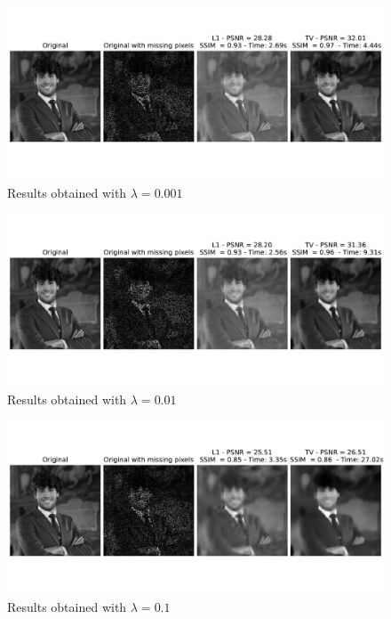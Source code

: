 \documentclass[12pt]{article}
\begin{document}
\begin{figure}
    \centering
    \includegraphics[width=17cm]{hw3/codes/exercise2/results/lambda_search/me_0-001.pdf}
    \caption{Results obtained with $\lambda = 0.001$}
    \label{fig:lambda-search-0.001}
\end{figure}

\begin{figure}
    \centering
    \includegraphics[width=17cm]{hw3/codes/exercise2/results/lambda_search/me_0-01.pdf}
    \caption{Results obtained with $\lambda = 0.01$}
    \label{fig:lambda-search-0.01}
\end{figure}

\begin{figure}
    \centering
    \includegraphics[width=17cm]{hw3/codes/exercise2/results/lambda_search/me_0-1.pdf}
    \caption{Results obtained with $\lambda = 0.1$}
    \label{fig:lambda-search-0.1}
\end{figure}
\end{document}

